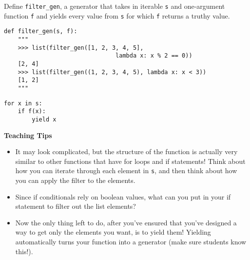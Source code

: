 \begin{blocksection}
\question Define \lstinline$filter_gen$, a generator that takes in iterable \lstinline$s$ and one-argument function  \lstinline$f$ and yields every value
from \lstinline$s$ for which \lstinline$f$ returns a truthy value.

\begin{lstlisting}
def filter_gen(s, f):
    """
    >>> list(filter_gen([1, 2, 3, 4, 5],
                                lambda x: x % 2 == 0))
    [2, 4]
    >>> list(filter_gen((1, 2, 3, 4, 5), lambda x: x < 3))
    [1, 2]
    """
\end{lstlisting}

\begin{solution}[1.5in]
\begin{lstlisting}
for x in s:
    if f(x):
        yield x
\end{lstlisting}
\end{solution}
\end{blocksection}

\begin{blocksection}
\begin{guide}
\textbf{Teaching Tips}
\begin{itemize}
\item It may look complicated, but the structure of the function is actually very similar to other functions that have for loops and if statements! Think about how you can iterate through each element in \texttt{s}, and then think about how you can apply the filter to the elements.
\item Since if conditionals rely on boolean values, what can you put in your if statement to filter out the list elements?
\item Now the only thing left to do, after you've ensured that you've designed a way to get only the elements you want, is to yield them! Yielding automatically turns your function into a generator (make sure students know this!).
\end{itemize}
\end{guide}
\end{blocksection}